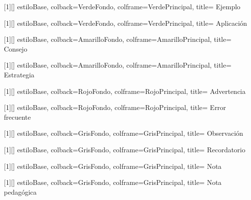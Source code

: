 [1][]{
    estiloBase,
    colback=VerdeFondo,
    colframe=VerdePrincipal,
    title={
        Ejemplo
    }
}

[1][]{
    estiloBase,
    colback=VerdeFondo,
    colframe=VerdePrincipal,
    title={
        Aplicación
    }
}



[1][]{
    estiloBase,
    colback=AmarilloFondo,
    colframe=AmarilloPrincipal,
    title={
        Consejo
    }
}

[1][]{
    estiloBase,
    colback=AmarilloFondo,
    colframe=AmarilloPrincipal,
    title={
        Estrategia
    }
}



[1][]{
    estiloBase,
    colback=RojoFondo,
    colframe=RojoPrincipal,
    title={
        Advertencia
    }
}

[1][]{
    estiloBase,
    colback=RojoFondo,
    colframe=RojoPrincipal,
    title={
        Error frecuente
    }
}



[1][]{
    estiloBase,
    colback=GrisFondo,
    colframe=GrisPrincipal,
    title={
        Observación
    }
}

[1][]{
    estiloBase,
    colback=GrisFondo,
    colframe=GrisPrincipal,
    title={
        Recordatorio
    }
}

[1][]{
    estiloBase,
    colback=GrisFondo,
    colframe=GrisPrincipal,
    title={
        Nota
    }
}

[1][]{
    estiloBase,
    colback=GrisFondo,
    colframe=GrisPrincipal,
    title={
        Nota pedagógica
    }
}


